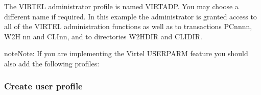 \documentclass[letterpaper,10pt,english]{sphinxmanual}
\begin{document}
\sphinxAtStartPar
{}

\sphinxAtStartPar
The VIRTEL administrator profile is named VIRTADP. You may choose a different name if required. In this example the administrator is granted access to all of the VIRTEL administration functions as well as to transactions PC\sphinxhyphen{}nnnn, W2H\sphinxhyphen{} nn and CLI\sphinxhyphen{}nn, and to directories W2H\sphinxhyphen{}DIR and CLI\sphinxhyphen{}DIR.

\begin{sphinxadmonition}{note}{Note:}
\sphinxAtStartPar
If you are implementing the Virtel USERPARM feature you should also add the following profiles:

\begin{sphinxVerbatim}[commandchars=\\\{\}]
   
  
             
\end{sphinxVerbatim}
\end{sphinxadmonition}


\subsubsection{Create user profile}
\label{\detokenize{Installation_Guide:create-user-profile}}
\begin{sphinxVerbatim}[commandchars=\\\{\}]
   
         
  
  
  
  
\end{sphinxVerbatim}
\end{document}

